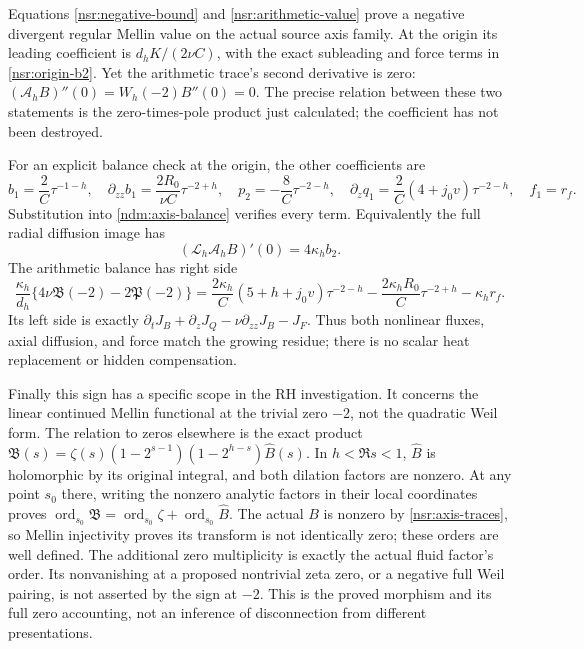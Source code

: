 Equations \eqref{nsr:negative-bound} and \eqref{nsr:arithmetic-value}
prove a negative divergent regular Mellin value on the actual source
axis family. At the origin its leading coefficient is
\(d_hK/(2\nu C)\), with the exact subleading and force terms in
\eqref{nsr:origin-b2}. Yet the arithmetic trace's second derivative
is zero: \((\mathcal A_hB)''(0)=W_h(-2)B''(0)=0\).
The precise relation between these two statements is the zero-times-pole
product just calculated; the coefficient has not been destroyed.

For an explicit balance check at the origin, the other coefficients are
\[
 b_1=\frac2C\tau^{-1-h},\quad
 \partial_{zz}b_1=\frac{2R_0}{\nu C}\tau^{-2+h},\quad
 p_2=-\frac8C\tau^{-2-h},\quad
 \partial_zq_1=\frac2C(4+j_0v)\tau^{-2-h},\quad f_1=r_f.
\]
Substitution into \eqref{ndm:axis-balance} verifies every term.
Equivalently the full radial diffusion image has
\[
 (\mathscr L_h\mathcal A_hB)'(0)=4\kappa_hb_2.
\]
The arithmetic balance has right side
\[
 \frac{\kappa_h}{d_h}
      \{4\nu\mathfrak B(-2)-2\mathfrak P(-2)\}
 =\frac{2\kappa_h}{C}(5+h+j_0v)\tau^{-2-h}
     -\frac{2\kappa_hR_0}{C}\tau^{-2+h}-\kappa_h r_f.
\]
Its left side is exactly
\(\partial_tJ_B+\partial_zJ_Q-\nu\partial_{zz}J_B-J_F\).
Thus both nonlinear fluxes, axial diffusion, and force match the
growing residue; there is no scalar heat replacement or hidden compensation.

Finally this sign has a specific scope in the RH investigation.
It concerns the linear continued Mellin functional at the trivial
zero \(-2\), not the quadratic Weil form. The relation to zeros
elsewhere is the exact product
\(\mathfrak B(s)=\zeta(s)(1-2^{s-1})(1-2^{h-s})\widehat B(s)\).
In \(h<\Re s<1\), \(\widehat B\) is holomorphic by its original
integral, and both dilation factors are nonzero. At any point
\(s_0\) there, writing the nonzero analytic factors in their local
coordinates proves
\(\operatorname{ord}_{s_0}\mathfrak B
=\operatorname{ord}_{s_0}\zeta+\operatorname{ord}_{s_0}\widehat B\).
The actual \(B\) is nonzero by \eqref{nsr:axis-traces}, so Mellin
injectivity proves its transform is not identically zero; these
orders are well defined. The additional zero multiplicity is exactly
the actual fluid factor's order. Its nonvanishing at a proposed
nontrivial zeta zero, or a negative full Weil pairing, is not asserted
by the sign at \(-2\). This is the proved morphism and its full
zero accounting, not an inference of disconnection from different
presentations.
